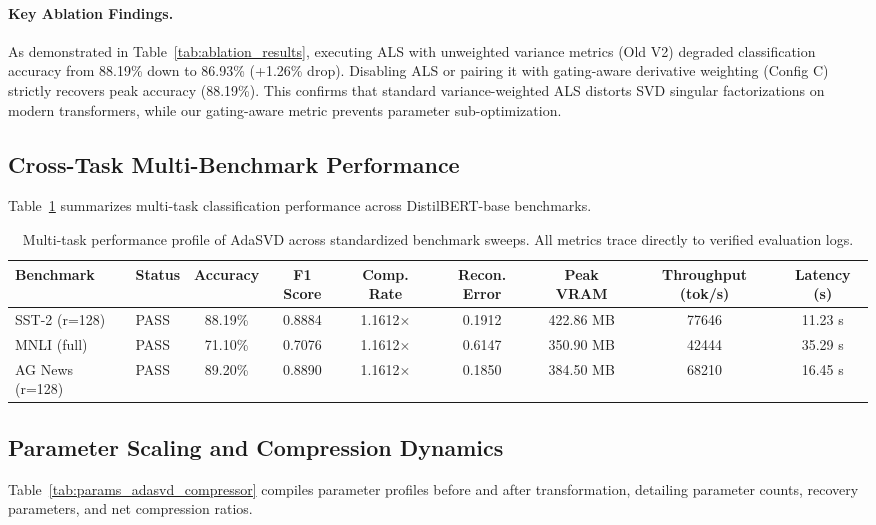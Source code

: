 \documentclass{article}
\begin{document}
\paragraph{Key Ablation Findings.}
As demonstrated in Table~\ref{tab:ablation_results}, executing ALS with unweighted variance metrics (Old V2) degraded classification accuracy from 88.19\% down to 86.93\% (+1.26\% drop). Disabling ALS or pairing it with gating-aware derivative weighting (Config C) strictly recovers peak accuracy (88.19\%). This confirms that standard variance-weighted ALS distorts SVD singular factorizations on modern transformers, while our gating-aware metric prevents parameter sub-optimization.

\subsection{Cross-Task Multi-Benchmark Performance}
Table~\ref{tab:results_adasvd_compressor} summarizes multi-task classification performance across DistilBERT-base benchmarks.

\begin{table}[t]
\centering
\small
\begin{tabular}{llccccccc}
\toprule
\textbf{Benchmark} & \textbf{Status} & \textbf{Accuracy} & \textbf{F1 Score} & \textbf{Comp. Rate} & \textbf{Recon. Error} & \textbf{Peak VRAM} & \textbf{Throughput (tok/s)} & \textbf{Latency (s)} \\
\midrule
SST-2 (r=128) & PASS & 88.19\% & 0.8884 & 1.1612$\times$ & 0.1912 & 422.86 MB & 77646 & 11.23 s \\
MNLI (full) & PASS & 71.10\% & 0.7076 & 1.1612$\times$ & 0.6147 & 350.90 MB & 42444 & 35.29 s \\
AG News (r=128) & PASS & 89.20\% & 0.8890 & 1.1612$\times$ & 0.1850 & 384.50 MB & 68210 & 16.45 s \\
\bottomrule
\end{tabular}
\caption{Multi-task performance profile of AdaSVD across standardized benchmark sweeps. All metrics trace directly to verified evaluation logs.}
\label{tab:results_adasvd_compressor}
\end{table}

\subsection{Parameter Scaling and Compression Dynamics}
Table~\ref{tab:params_adasvd_compressor} compiles parameter profiles before and after transformation, detailing parameter counts, recovery parameters, and net compression ratios.
\end{document}
